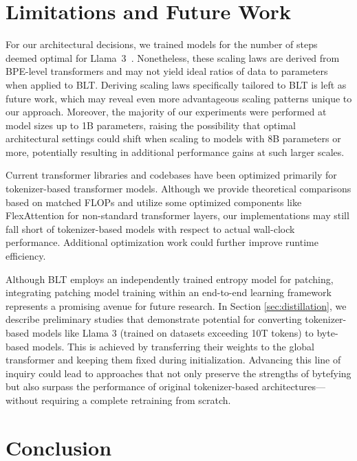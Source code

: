 \section{Limitations and Future Work}

For our architectural decisions, we trained models for the number of steps deemed optimal for Llama~3~\citep{dubey2024llama}. Nonetheless, these scaling laws are derived from BPE-level transformers and may not yield ideal ratios of data to parameters when applied to {\textsc BLT}. Deriving scaling laws specifically tailored to {\textsc BLT} is left as future work, which may reveal even more advantageous scaling patterns unique to our approach. Moreover, the majority of our experiments were performed at model sizes up to 1B parameters, raising the possibility that optimal architectural settings could shift when scaling to models with 8B parameters or more, potentially resulting in additional performance gains at such larger scales.

Current transformer libraries and codebases have been optimized primarily for tokenizer-based transformer models. Although we provide theoretical comparisons based on matched FLOPs and utilize some optimized components like FlexAttention for non-standard transformer layers, our implementations may still fall short of tokenizer-based models with respect to actual wall-clock performance. Additional optimization work could further improve runtime efficiency.

Although {\textsc BLT} employs an independently trained entropy model for patching, integrating patching model training within an end-to-end learning framework represents a promising avenue for future research. In Section \ref{sec:distillation}, we describe preliminary studies that demonstrate potential for converting tokenizer-based models like Llama 3 (trained on datasets exceeding 10T tokens) to byte-based models. This is achieved by transferring their weights to the global transformer and keeping them fixed during initialization. Advancing this line of inquiry could lead to approaches that not only preserve the strengths of bytefying but also surpass the performance of original tokenizer-based architectures—without requiring a complete retraining from scratch.

\section{Conclusion}
\label{section:conclusion}

